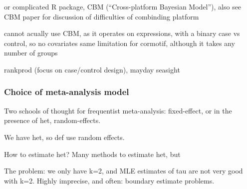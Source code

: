 or complicated R package, CBM (“Cross-platform Bayesian Model”),
also see CBM paper for discussion of difficulties of combinding platform

cannot acually use CBM, as it operates on expressions, with a binary case vs control, so no covariates
same limitation for cormotif, although it takes any number of groups

rankprod (focus on case/control design), mayday seasight

\subsubsection{Choice of meta-analysis model}

Two schools of thought for frequentist meta-analysis: 
fixed-effect, 
or in the presence of het, random-effects.

We have het, so def use random effects.

How to estimate het?
Many methods to estimate het, but

The problem: we only have k=2, and MLE estimates of tau are not very good with k=2.
Highly imprecise, and often:
boundary estimate problems.  

